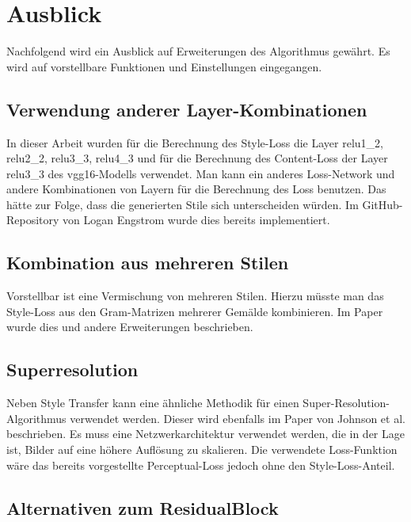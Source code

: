 \section{Ausblick}

Nachfolgend wird ein Ausblick auf Erweiterungen des Algorithmus gewährt. Es wird auf vorstellbare Funktionen und Einstellungen eingegangen.

\subsection{Verwendung anderer Layer-Kombinationen}

In dieser Arbeit wurden für die Berechnung des Style-Loss die Layer relu1\_2, relu2\_2, relu3\_3, relu4\_3 und für die Berechnung des Content-Loss der Layer relu3\_3 des \gls{vgg16}-Modells verwendet. Man kann ein anderes Loss-Network und andere Kombinationen von Layern für die Berechnung des Loss benutzen. Das hätte zur Folge, dass die generierten Stile sich unterscheiden würden. Im GitHub-Repository von Logan Engstrom  \cite{engstrom2016faststyletransfer} wurde dies bereits implementiert.

\subsection{Kombination aus mehreren Stilen}
\label{sec:combination_many_styles}

Vorstellbar ist eine Vermischung von mehreren Stilen. Hierzu müsste man das Style-Loss aus den Gram-Matrizen mehrerer Gemälde kombinieren. Im Paper \cite{stanfordStyleTransfer} wurde dies und andere Erweiterungen beschrieben.

\subsection{Superresolution}
\label{sec:superresolution}

Neben Style Transfer kann eine ähnliche Methodik für einen Super-Resolution-Algorithmus verwendet werden. Dieser wird ebenfalls im Paper von Johnson et al. \cite{DBLP:journals/corr/JohnsonAL16} beschrieben. Es muss eine Netzwerkarchitektur verwendet werden, die in der Lage ist, Bilder auf eine höhere Auflösung zu skalieren. Die verwendete Loss-Funktion wäre das bereits vorgestellte Perceptual-Loss jedoch ohne den Style-Loss-Anteil.

\subsection{Alternativen zum ResidualBlock}
\label{sec:alternatives_to_residual_block}

